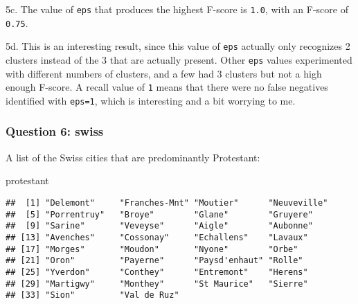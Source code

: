 \documentclass[]{article}
\newenvironment{Shaded}{\begin{snugshade}}{\end{snugshade}}
\newcommand{\KeywordTok}[1]{\textcolor[rgb]{0.13,0.29,0.53}{\textbf{#1}}}
\newcommand{\DataTypeTok}[1]{\textcolor[rgb]{0.13,0.29,0.53}{#1}}
\newcommand{\DecValTok}[1]{\textcolor[rgb]{0.00,0.00,0.81}{#1}}
\newcommand{\StringTok}[1]{\textcolor[rgb]{0.31,0.60,0.02}{#1}}
\newcommand{\OperatorTok}[1]{\textcolor[rgb]{0.81,0.36,0.00}{\textbf{#1}}}
\newcommand{\NormalTok}[1]{#1}
\begin{document}
5c. The value of \texttt{eps} that produces the highest F-score is
\texttt{1.0}, with an F-score of \texttt{0.75}.

5d. This is an interesting result, since this value of \texttt{eps}
actually only recognizes 2 clusters instead of the 3 that are actually
present. Other \texttt{eps} values experimented with different numbers
of clusters, and a few had 3 clusters but not a high enough F-score. A
recall value of \texttt{1} means that there were no false negatives
identified with \texttt{eps=1}, which is interesting and a bit worrying
to me.

\subsubsection{Question 6: swiss}\label{question-6-swiss}

\begin{Shaded}
\end{Shaded}

A list of the Swiss cities that are predominantly Protestant:

\begin{Shaded}
\begin{Highlighting}[]
\NormalTok{protestant}
\end{Highlighting}
\end{Shaded}

\begin{verbatim}
##  [1] "Delemont"     "Franches-Mnt" "Moutier"      "Neuveville"  
##  [5] "Porrentruy"   "Broye"        "Glane"        "Gruyere"     
##  [9] "Sarine"       "Veveyse"      "Aigle"        "Aubonne"     
## [13] "Avenches"     "Cossonay"     "Echallens"    "Lavaux"      
## [17] "Morges"       "Moudon"       "Nyone"        "Orbe"        
## [21] "Oron"         "Payerne"      "Paysd'enhaut" "Rolle"       
## [25] "Yverdon"      "Conthey"      "Entremont"    "Herens"      
## [29] "Martigwy"     "Monthey"      "St Maurice"   "Sierre"      
## [33] "Sion"         "Val de Ruz"
\end{verbatim}
\end{document}
